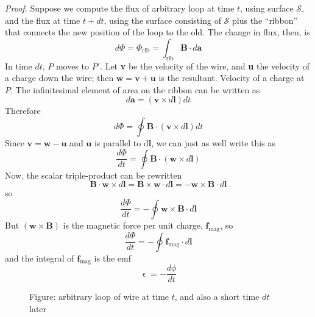 \documentclass[../../../main.tex]{subfiles}
\begin{document}
\emph{Proof.} Suppose we compute the ﬂux of arbitrary loop at time $t$, using surface $\mathcal{S}$, and the ﬂux at time $t + dt$, using the surface consisting of $\mathcal{S}$ plus the “ribbon” that connects the new position of the loop to the old. The change in ﬂux, then, is
\begin{equation*}
    d\Phi=\Phi_\text{rib}=\int_\text{rib} \mathbf{B}\cdot d\mathbf{a}
\end{equation*}
In time $dt$, $P$ moves to $P'$.  Let \textbf{v} be the velocity of the wire, and \textbf{u} the velocity of a charge down the wire; then $\mathbf{w} = \mathbf{v} + \mathbf{u}$ is the resultant. Velocity of a charge at $P$. The inﬁnitesimal element of area on the ribbon can be written as
\begin{equation*}
    d\mathbf{a} = (\mathbf{v} \times d\mathbf{l}) dt
\end{equation*}
Therefore
\begin{equation*}
    d\Phi=\oint\mathbf{B}\cdot  (\mathbf{v} \times d\mathbf{l}) dt
\end{equation*}
Since $\mathbf{v}=\mathbf{w}-\mathbf{u}$ and $\mathbf{u}$ is parallel to d\textbf{l}, we can just as well write this as 
\begin{equation*}
    \frac{d\Phi}{dt}=\oint\mathbf{B}\cdot  (\mathbf{w} \times d\mathbf{l})
\end{equation*}
Now, the scalar triple-product can be rewritten
\begin{equation*}
    \mathbf{B}\cdot \mathbf{w}\times d\mathbf{l}=\mathbf{B}\times \mathbf{w}\cdot d\mathbf{l}= -\mathbf{w}\times\mathbf{B} \cdot d\mathbf{l}
\end{equation*}
so
\begin{equation*}
    \frac{d\Phi}{dt}=-\oint\mathbf{w}\times\mathbf{B} \cdot d\mathbf{l}
\end{equation*}
But $(\mathbf{w}\times\mathbf{B} )$ is the magnetic force per unit charge, $\mathbf{f}_\text{mag}$, so
\begin{equation*}
    \frac{d\Phi}{dt}=-\oint\mathbf{f}_\text{mag}\cdot d\mathbf{l}
\end{equation*}
and the integral of $\mathbf{f}_\text{mag}$ is the emf
\begin{equation*}
    \upvarepsilon=-\frac{d\phi}{dt}
\end{equation*}

\begin{figure*}
    \centering
    \caption*{Figure:  arbitrary loop of wire at time $t$, and also a short time $dt$ later}
\end{figure*}
\end{document}

